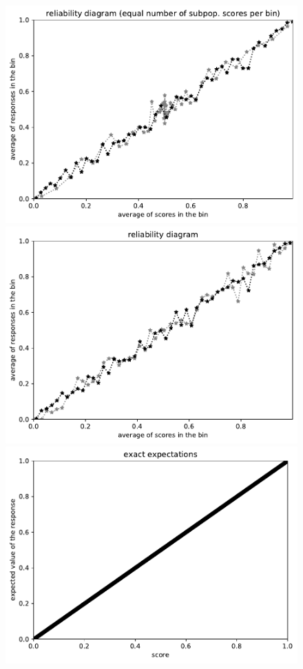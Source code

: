 \documentclass{article}
\newlength{\vertsep}
\newlength{\imsize}
\begin{document}
\begin{figure}
\begin{centering}
\parbox{\imsize}{\includegraphics[width=\imsize]
{../codes/unweighted/10000_7000_50_3/equisamps.pdf}}
\quad\quad
\parbox{\imsize}{\includegraphics[width=\imsize]
{../codes/unweighted/10000_7000_50_3/equiscore.pdf}}

\vspace{\vertsep}

\parbox{\imsize}{\includegraphics[width=\imsize]
{../codes/unweighted/10000_7000_10_3/exact.pdf}}


\end{centering}
\end{figure}
\end{document}
